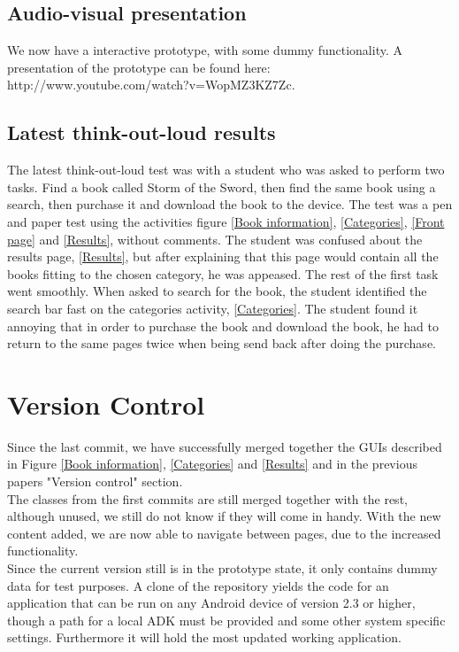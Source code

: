 \documentclass[12pt]{article}
\begin{document}
\subsection{Audio-visual presentation}
We now have a interactive prototype, with some dummy functionality. A presentation of the prototype can be found here: http://www.youtube.com/watch?v=WopMZ3KZ7Zc.

\subsection{Latest think-out-loud results}
The latest think-out-loud test was with a student who was asked to perform two tasks. Find a book called Storm of the Sword, then find the same book using a search, then purchase it and download the book to the device. The test was a pen and paper test using the activities figure \ref{Book information}, \ref{Categories}, \ref{Front page} and \ref{Results}, without comments. The student was confused about the results page, \ref{Results}, but after explaining that this page would contain all the books fitting to the chosen category, he was appeased. The rest of the first task went smoothly. When asked to search for the book, the student identified the search bar fast on the categories
activity, \ref{Categories}. The student found it annoying that in order to purchase the book and download the book, he had to return to the same pages twice when being send back after doing the purchase.
\section{Version Control}

Since the last commit, we have successfully merged together the GUIs described in Figure \ref{Book information}, \ref{Categories} and \ref{Results} and in the previous papers "Version control" section.\\
The classes from the first commits are still merged together with the rest, although unused, we still do not know if they will come in handy. With the new content added, we are now able to navigate between pages, due to the increased functionality.\\ 
Since the current version still is in the prototype state, it only contains dummy data for test purposes. A clone of the repository yields the code for an application that can be run on any Android device of version 2.3 or higher, though a path for a local ADK must be provided and some other system specific settings. Furthermore it will hold the most updated working application.\\
\end{document}
